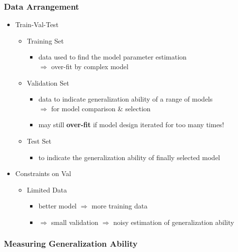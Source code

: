 \subsubsection{Data Arrangement}
\begin{itemize}
\item Train-Val-Test
	\begin{itemize}
	\item Training Set
		\begin{itemize}
		\item data used to find the model parameter estimation \\
		$\Rightarrow$ over-fit by complex model
		\end{itemize}
	\item Validation Set
		\begin{itemize}
		\item data to indicate generalization ability of a range of models \\
		$\Rightarrow$ for model comparison \& selection
		\item may still \textbf{over-fit} if model design iterated for too many times!
		\end{itemize}
	\item Test Set
		\begin{itemize}
		\item to indicate the generalization ability of finally selected model
		\end{itemize}
	\end{itemize}

\item Constraints on Val
	\begin{itemize}
	\item Limited Data
		\begin{itemize}
		\item better model $\Rightarrow$ more training data 
		\item $\Rightarrow$ small validation $\Rightarrow$ noisy estimation of generalization ability
		\end{itemize}
	\end{itemize}
	
\end{itemize}

\subsubsection{Measuring Generalization Ability}

